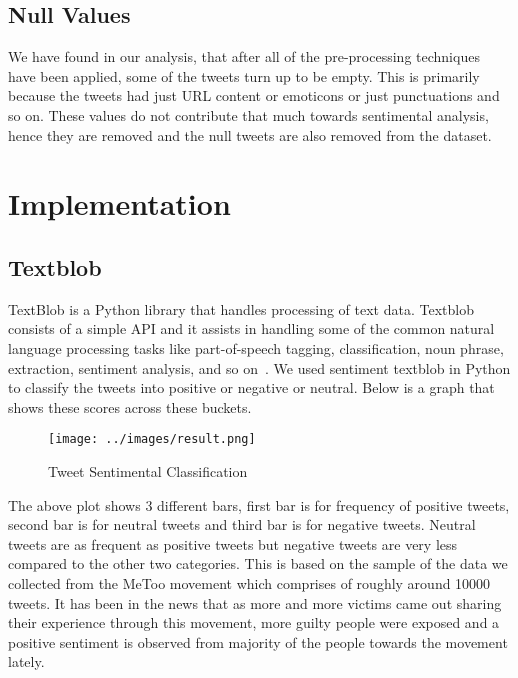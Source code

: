 \subsection{Null Values}
We have found in our analysis, that after all of the pre-processing techniques have been 
applied, some of the tweets turn up to be empty. This is primarily because the tweets had just 
URL content or emoticons or just punctuations and so on. These values do not contribute that 
much towards sentimental analysis, hence they are removed and the null tweets are also 
removed from the dataset.

\section{Implementation}

\subsection{Textblob}
TextBlob is a Python library that handles processing of text data. 
Textblob consists of a simple API and it assists in handling some of the common 
natural language processing tasks like part-of-speech tagging, classification, 
noun phrase, extraction, sentiment analysis, and so on~\cite{hid-sp18-418-textblob}.
We used sentiment textblob in Python to classify the tweets into positive or 
negative or neutral. Below is a graph that shows these scores across these 
buckets. \\

\begin{figure}[!ht]
\centering\texttt{[image: ../images/result.png]}
\caption{Tweet Sentimental Classification}
\label{f:Sentimental Analysis}
\end{figure}

The above plot shows 3 different bars, first bar is for frequency of positive 
tweets, second bar is for neutral tweets and third bar is for negative tweets. 
Neutral tweets are as frequent as positive tweets but negative tweets are very 
less compared to the other two categories. This is based on the sample of the 
data we collected from the MeToo movement which comprises of roughly around 
10000 tweets. It has been in the news that as more and more victims came 
out sharing their experience through this movement, more guilty people were 
exposed and a positive sentiment is observed from majority of the people 
towards the movement lately. 


